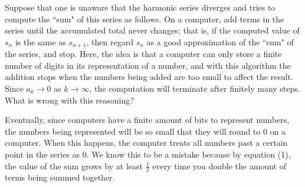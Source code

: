 \documentclass{exam}
\begin{document}
\begin{questions}
\question %
Suppose that one is unaware that the harmonic series diverges and tries to compute the ``sum" of this series as follows. On a computer, add terms in the series until the accumulated total never changes; that is, if the computed value of $s_n$ is the same as $s_{n + 1}$, then regard $s_n$ as a good approximation of the ``sum" of the series, and stop. Here, the idea is that a computer can only store a finite number of digits in its representation of a number, and with this algorithm the addition stops when the numbers being added are too small to affect the result. Since $a_k \rightarrow 0$ as $k \rightarrow \infty$, the computation will terminate after finitely many steps. What is wrong with this reasoning?

\sol
Eventually, since computers have a finite amount of bits to represent numbers, the numbers being represented will be so small that they will round to 0 on a computer. When this happens, the computer treats all numbers past a certain point in the series as 0. We know this to be a mistake because by equation (1), the value of the sum grows by at least $\frac{1}{2}$ every time you double the amount of terms being summed together.
\end{questions}
\end{document}
